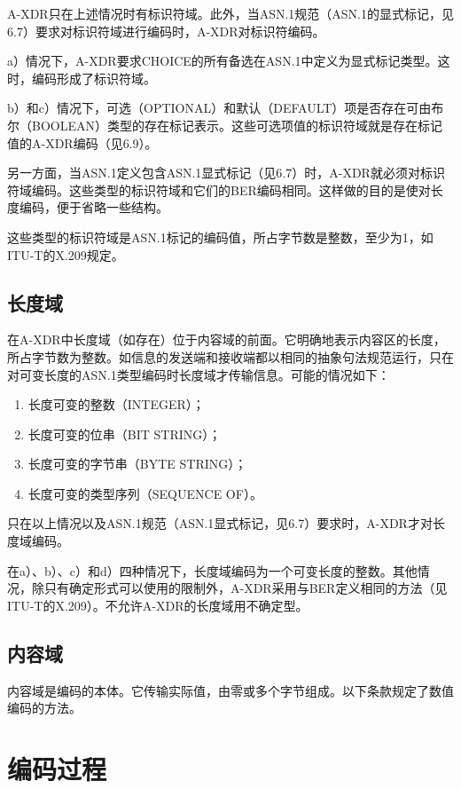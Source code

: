 \documentclass[a4paper,11pt]{ctexart}
\begin{document}
A-XDR只在上述情况时有标识符域。此外，当ASN.1规范（ASN.1的显式标记，见6.7）要求对标识符域进行编码时，A-XDR对标识符编码。

a）情况下，A-XDR要求CHOICE的所有备选在ASN.1中定义为显式标记类型。这时，编码形成了标识符域。

b）和c）情况下，可选（OPTIONAL）和默认（DEFAULT）项是否存在可由布尔（BOOLEAN）类型的存在标记表示。这些可选项值的标识符域就是存在标记值的A-XDR编码（见6.9）。

另一方面，当ASN.1定义包含ASN.1显式标记（见6.7）时，A-XDR就必须对标识符域编码。这些类型的标识符域和它们的BER编码相同。这样做的目的是使对长度编码，便于省略一些结构。

这些类型的标识符域是ASN.1标记的编码值，所占字节数是整数，至少为1，如ITU-T的X.209规定。

\subsection{长度域}

在A-XDR中长度域（如存在）位于内容域的前面。它明确地表示内容区的长度，所占字节数为整数。如信息的发送端和接收端都以相同的抽象句法规范运行，只在对可变长度的ASN.1类型编码时长度域才传输信息。可能的情况如下：
\begin{enumerate}[label=\alph*)]
\item 长度可变的整数（INTEGER）；
\item 长度可变的位串（BIT STRING）；
\item 长度可变的字节串（BYTE STRING）；
\item 长度可变的类型序列（SEQUENCE OF）。
\end{enumerate}

只在以上情况以及ASN.1规范（ASN.1显式标记，见6.7）要求时，A-XDR才对长度域编码。

在a）、b）、c）和d）四种情况下，长度域编码为一个可变长度的整数。其他情况，除只有确定形式可以使用的限制外，A-XDR采用与BER定义相同的方法（见ITU-T的X.209）。不允许A-XDR的长度域用不确定型。

\subsection{内容域}

内容域是编码的本体。它传输实际值，由零或多个字节组成。以下条款规定了数值编码的方法。

\section{编码过程}
\end{document}
